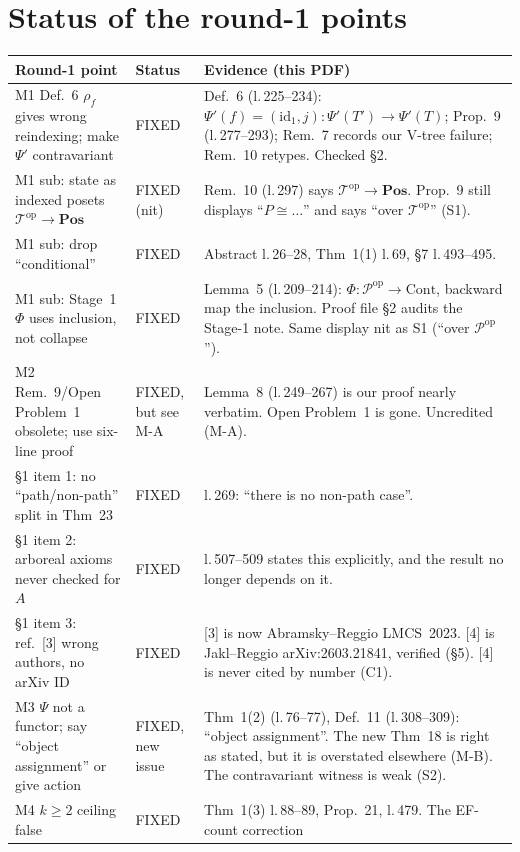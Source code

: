 \documentclass[11pt]{article}
\newcommand{\Cont}{\mathrm{Cont}}
\newcommand{\Pos}{\mathbf{Pos}}
\newcommand{\T}{\mathcal T}
\begin{document}
\section{Status of the round-1 points}
\begin{center}\small
\begin{tabular}{p{4.6cm}p{1.7cm}p{9.2cm}}
\toprule
Round-1 point & Status & Evidence (this PDF)\\\midrule
M1 Def.~6 $\rho_f$ gives wrong reindexing; make $\Psi'$ contravariant & FIXED & Def.~6
(l.\,225--234): $\Psi'(f)=(\mathrm{id}_1,j)\colon\Psi'(T')\to\Psi'(T)$; Prop.~9 (l.\,277--293);
Rem.~7 records our V-tree failure; Rem.~10 retypes. Checked \S2.\\
M1 sub: state as indexed posets $\T^{\mathrm{op}}\to\Pos$ & FIXED (nit) & Rem.~10 (l.\,297) says
$\T^{\mathrm{op}}\to\Pos$. Prop.~9 still displays ``$P\cong\dots$'' and says ``over $\T^{\mathrm{op}}$'' (S1).\\
M1 sub: drop ``conditional'' & FIXED & Abstract l.\,26--28, Thm~1(1) l.\,69, \S7 l.\,493--495.\\
M1 sub: Stage~1 $\Phi$ uses inclusion, not collapse & FIXED & Lemma~5 (l.\,209--214): $\Phi\colon
\mathcal P^{\mathrm{op}}\to\Cont$, backward map the inclusion. Proof file \S2 audits the Stage-1
note. Same display nit as S1 (``over $\mathcal P^{\mathrm{op}}$'').\\
M2 Rem.~9/Open Problem~1 obsolete; use six-line proof & FIXED, but see M-A & Lemma~8 (l.\,249--267) is
our proof nearly verbatim. Open Problem~1 is gone. Uncredited (M-A).\\
\S1 item 1: no ``path/non-path'' split in Thm~23 & FIXED & l.\,269: ``there is no non-path case''.\\
\S1 item 2: arboreal axioms never checked for $A$ & FIXED & l.\,507--509 states this explicitly, and
the result no longer depends on it.\\
\S1 item 3: ref.\ [3] wrong authors, no arXiv ID & FIXED & [3] is now Abramsky--Reggio LMCS~2023.
[4] is Jakl--Reggio arXiv:2603.21841, verified (\S5). [4] is never cited by number (C1).\\
M3 $\Psi$ not a functor; say ``object assignment'' or give action & FIXED, new issue & Thm~1(2)
(l.\,76--77), Def.~11 (l.\,308--309): ``object assignment''. The new Thm~18 is right as stated, but
it is overstated elsewhere (M-B). The contravariant witness is weak (S2).\\
M4 $k\ge2$ ceiling false & FIXED & Thm~1(3) l.\,88--89, Prop.~21, l.\,479. The EF-count correction

\end{tabular}
\end{center}
\end{document}
